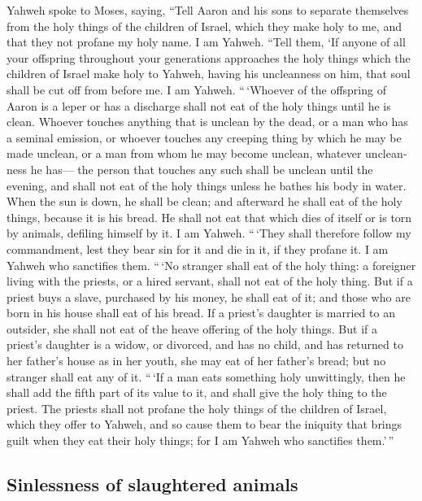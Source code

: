 \begin{paracol}{2}
\begin{otherlanguage}{english}
 Yahweh spoke to Moses, saying,  ``Tell
Aaron and his sons to separate themselves from the holy things of the
children of Israel, which they make holy to me, and that they not
profane my holy name. I am Yahweh.  ``Tell them, `If
anyone of all your offspring throughout your generations approaches the
holy things which the children of Israel make holy to Yahweh, having his
uncleanness on him, that soul shall be cut off from before me. I am
Yahweh.  ``\,`Whoever of the offspring of Aaron is a leper
or has a discharge shall not eat of the holy things until he is clean.
Whoever touches anything that is unclean by the dead, or a man who has a
seminal emission,  or whoever touches any creeping thing
by which he may be made unclean, or a man from whom he may become
unclean, whatever uncleanness he has---  the person that
touches any such shall be unclean until the evening, and shall not eat
of the holy things unless he bathes his body in water. 
When the sun is down, he shall be clean; and afterward he shall eat of
the holy things, because it is his bread.  He shall not
eat that which dies of itself or is torn by animals, defiling himself by
it. I am Yahweh.  ``\,`They shall therefore follow my
commandment, lest they bear sin for it and die in it, if they profane
it. I am Yahweh who sanctifies them.  ``\,`No stranger
shall eat of the holy thing: a foreigner living with the priests, or a
hired servant, shall not eat of the holy thing.  But if a
priest buys a slave, purchased by his money, he shall eat of it; and
those who are born in his house shall eat of his bread. 
If a priest's daughter is married to an outsider, she shall not eat of
the heave offering of the holy things.  But if a priest's
daughter is a widow, or divorced, and has no child, and has returned to
her father's house as in her youth, she may eat of her father's bread;
but no stranger shall eat any of it.  ``\,`If a man eats
something holy unwittingly, then he shall add the fifth part of its
value to it, and shall give the holy thing to the priest.
 The priests shall not profane the holy things of the
children of Israel, which they offer to Yahweh,  and so
cause them to bear the iniquity that brings guilt when they eat their
holy things; for I am Yahweh who sanctifies them.'\,''

\hypertarget{sinlessness-of-slaughtered-animals}{%
\subsection{Sinlessness of slaughtered
animals}\label{sinlessness-of-slaughtered-animals}}


\end{otherlanguage}
\end{paracol}

